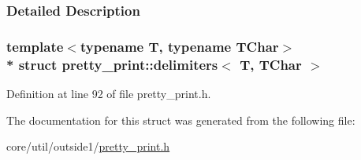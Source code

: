 \subsubsection{Detailed Description}
\subsubsection*{template$<$typename T, typename T\+Char$>$\\*
struct pretty\+\_\+print\+::delimiters$<$ T, T\+Char $>$}



Definition at line 92 of file pretty\+\_\+print.\+h.



The documentation for this struct was generated from the following file\+:\begin{DoxyCompactItemize}
\item 
core/util/outside1/\hyperlink{pretty__print_8h}{pretty\+\_\+print.\+h}\end{DoxyCompactItemize}
